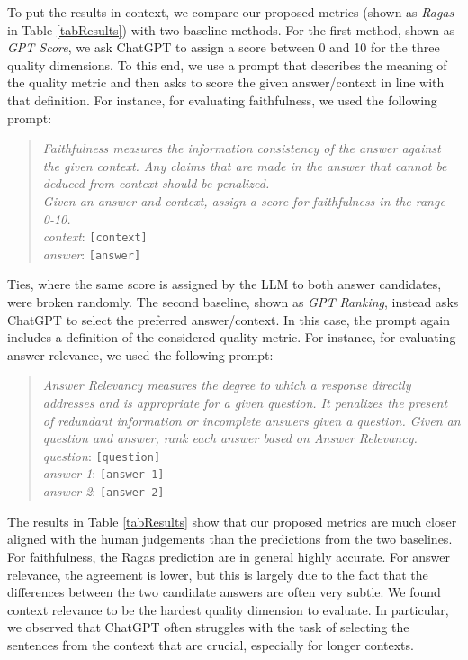 \documentclass[11pt]{article}
\begin{document}
To put the results in context, we compare our proposed metrics (shown as \textit{Ragas} in Table \ref{tabResults}) with two baseline methods. For the first method, shown as \emph{GPT Score}, we ask ChatGPT to assign a score between 0 and 10 for the three quality dimensions. To this end, we use a prompt that describes the meaning of the quality metric and then asks to score the given answer/context in line with that definition. For instance, for evaluating faithfulness, we used the following prompt:
\begin{quote}
\textit{Faithfulness measures the information consistency of the answer against the given context. Any claims that are made in the answer that cannot be deduced from context should be penalized.\\
Given an answer and context, assign a score for faithfulness in the range 0-10.\\
context}: \texttt{[context]}\\
\textit{answer}: \texttt{[answer]}
\end{quote}
Ties, where the same score is assigned by the LLM to both answer candidates, were broken randomly.
The second baseline, shown as \emph{GPT Ranking}, instead asks ChatGPT to select the preferred answer/context. In this case, the prompt again includes a definition of the considered quality metric. For instance, for evaluating answer relevance, we used the following prompt:
\begin{quote}
\textit{Answer Relevancy measures the degree to which a response directly addresses and is appropriate for a given question. It penalizes the present of redundant information or incomplete answers given a question.
Given an question and answer, rank each answer based on Answer Relevancy.\\
question}: \texttt{[question]}\\
\textit{answer 1}: \texttt{[answer 1]}\\
\textit{answer 2}: \texttt{[answer 2]}
\end{quote}

The results in Table \ref{tabResults} show that our proposed metrics are much closer aligned with the human judgements than the predictions from the two baselines. For faithfulness, the Ragas prediction are in general highly accurate. For answer relevance, the agreement is lower, but this is largely due to the fact that the differences between the two candidate answers are often very subtle. We found context relevance to be the hardest quality dimension to evaluate. In particular, we observed that ChatGPT often struggles with the task of selecting the sentences from the context that are crucial, especially for longer contexts. 
\end{document}
